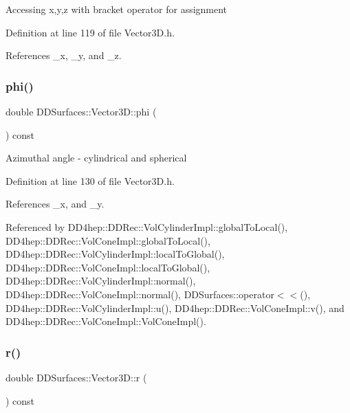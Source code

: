 Accessing x,y,z with bracket operator for assignment 

Definition at line 119 of file Vector3\+D.\+h.



References \+\_\+x, \+\_\+y, and \+\_\+z.

\hypertarget{class_d_d_surfaces_1_1_vector3_d_a57ee8078f7b734b05fb5da8165c0a499}{}\label{class_d_d_surfaces_1_1_vector3_d_a57ee8078f7b734b05fb5da8165c0a499} 
\subsubsection{\texorpdfstring{phi()}{phi()}}
{\footnotesize\ttfamily double D\+D\+Surfaces\+::\+Vector3\+D\+::phi (\begin{DoxyParamCaption}{ }\end{DoxyParamCaption}) const\hspace{0.3cm}{\ttfamily [inline]}}

Azimuthal angle -\/ cylindrical and spherical 

Definition at line 130 of file Vector3\+D.\+h.



References \+\_\+x, and \+\_\+y.



Referenced by D\+D4hep\+::\+D\+D\+Rec\+::\+Vol\+Cylinder\+Impl\+::global\+To\+Local(), D\+D4hep\+::\+D\+D\+Rec\+::\+Vol\+Cone\+Impl\+::global\+To\+Local(), D\+D4hep\+::\+D\+D\+Rec\+::\+Vol\+Cylinder\+Impl\+::local\+To\+Global(), D\+D4hep\+::\+D\+D\+Rec\+::\+Vol\+Cone\+Impl\+::local\+To\+Global(), D\+D4hep\+::\+D\+D\+Rec\+::\+Vol\+Cylinder\+Impl\+::normal(), D\+D4hep\+::\+D\+D\+Rec\+::\+Vol\+Cone\+Impl\+::normal(), D\+D\+Surfaces\+::operator$<$$<$(), D\+D4hep\+::\+D\+D\+Rec\+::\+Vol\+Cylinder\+Impl\+::u(), D\+D4hep\+::\+D\+D\+Rec\+::\+Vol\+Cone\+Impl\+::v(), and D\+D4hep\+::\+D\+D\+Rec\+::\+Vol\+Cone\+Impl\+::\+Vol\+Cone\+Impl().

\hypertarget{class_d_d_surfaces_1_1_vector3_d_af9101fe5b09d3db799f0231802c493d2}{}\label{class_d_d_surfaces_1_1_vector3_d_af9101fe5b09d3db799f0231802c493d2} 
\subsubsection{\texorpdfstring{r()}{r()}}
{\footnotesize\ttfamily double D\+D\+Surfaces\+::\+Vector3\+D\+::r (\begin{DoxyParamCaption}{ }\end{DoxyParamCaption}) const\hspace{0.3cm}{\ttfamily [inline]}}

